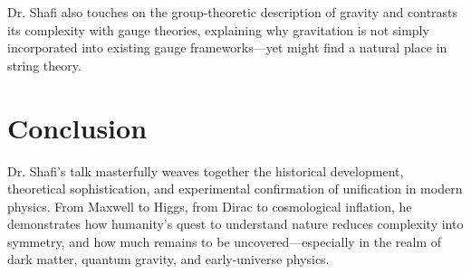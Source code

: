 \documentclass[12pt]{article}
\begin{document}
Dr. Shafi also touches on the group-theoretic description of gravity and contrasts its complexity with gauge theories, explaining why gravitation is not simply incorporated into existing gauge frameworks---yet might find a natural place in string theory.

\section*{Conclusion}
Dr. Shafi’s talk masterfully weaves together the historical development, theoretical sophistication, and experimental confirmation of unification in modern physics. From Maxwell to Higgs, from Dirac to cosmological inflation, he demonstrates how humanity’s quest to understand nature reduces complexity into symmetry, and how much remains to be uncovered---especially in the realm of dark matter, quantum gravity, and early-universe physics.
\end{document}
